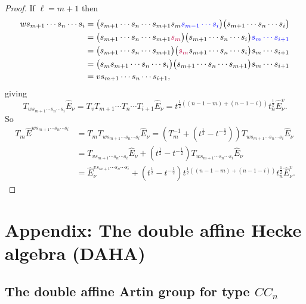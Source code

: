 \documentclass[11pt]{article}
\theoremstyle{plain}
\theoremstyle{definition}
\theoremstyle{remark}
\numberwithin{equation}{section}
\newcounter{r}
\newcounter{s}
\begin{document}
\begin{proof}
If $\ell=m+1$ then
\begin{align*}
ws_{m+1}\cdots s_n\cdots s_i &=
\big( s_{m+1} \cdots s_n \cdots s_{m+1}s_m {\color{blue}s_{m-1}\cdots s_i} \big)
\big(s_{m+1} \cdots s_n \cdots s_i \big) \\
&= \big( s_{m+1} \cdots s_n \cdots s_{m+1} {\color{purple} s_m} \big)
\big(s_{m+1} \cdots s_n \cdots s_i \big) {\color{blue}s_{m} \cdots s_{i+1}}  \\
&= \big( s_{m+1} \cdots s_n \cdots s_{m+1} \big)
\big({\color{purple} s_m} s_{m+1} \cdots s_n \cdots s_i \big) 
s_{m} \cdots s_{i+1}  \\
&= \big( s_m s_{m+1} \cdots s_n \cdots s_i \big) 
 \big( s_{m+1} \cdots s_n \cdots s_{m+1} \big)
s_m \cdots s_{i+1}  \\
&= v s_{m+1} \cdots s_n \cdots s_{i+1},
\end{align*}
giving
$$
T_{ws_{m+1}\cdots s_n\cdots s_i }\widehat{E}_\nu 
= T_vT_{m+1}\cdots T_n\cdots T_{i+1}\widehat{E}_\nu
= t^{\frac12((n-1-m)+(n-1-i))}t_n^{\frac12}\widehat{E}^v_\nu.
$$
So
\begin{align*}
T_m\widehat{E}^{ws_{m+1}\cdots s_n\cdots s_i}
&= T_mT_{ws_{m+1}\cdots s_n \cdots s_i}\widehat{E}_\nu
= (T_m^{-1}+(t^{\frac12}-t^{-\frac12}))T_{ws_{m+1}\cdots s_n \cdots s_i}\widehat{E}_\nu
\\
&= T_{vs_{m+1}\cdots s_n \cdots s_i}\widehat{E}_\nu
+(t^{\frac12}-t^{-\frac12})T_{ws_{m+1}\cdots s_n \cdots s_i}\widehat{E}_\nu
\\
&= \widehat{E}^{vs_{m+1}\cdots s_n \cdots s_i}_\nu
+(t^{\frac12}-t^{-\frac12})t^{\frac12((n-1-m)+(n-1-i))}t_n^{\frac12}\widehat{E}^v_\nu.
\end{align*}
\end{proof}




\newpage
\appendix

\section{Appendix: The double affine Hecke algebra (DAHA)}\label{section:DAHA}

\subsection{The double affine Artin group for type $CC_n$}
\end{document}
